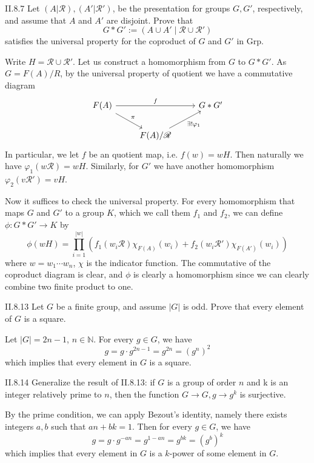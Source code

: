 \begin{problem}{II.8.7}
Let $(A|\mathscr{R}), (A'|\mathscr{R'})$, be the presentation for groups $G, G'$, respectively, and assume that $A$ and $A'$ are disjoint. Prove that
\[
G * G' := (A \cup A' \; |\; \mathscr{R} \cup \mathscr{R'})
\]
satisfies the universal property for the coproduct of $G$ and $G'$ in \textsf{Grp}.
\end{problem}
\begin{pf} Write $H = \mathscr{R} \cup \mathscr{R'}$. Let us construct a homomorphism from $G$ to $G * G'$. As $G = F(A)/R$, by the universal property of quotient we have a commutative diagram
\[
\begin{tikzcd}
F(A) \arrow[rr, "f"] \arrow[rd, "\pi"] &                                                   & G * G' \\
& F(A)/\mathscr{R} \arrow[ru, "\exists!\varphi_1"'] &       
\end{tikzcd}
\]
In particular, we let $f$ be an quotient map, i.e. $f(w) = wH$. Then naturally we have $\varphi_1(w\mathscr{R}) = wH$. Similarly, for $G'$ we have another homomorphism $\varphi_2(v\mathscr{R}') = vH$.

Now it suffices to check the universal property. For every homomorphism that maps $G$ and $G'$ to a group $K$, which we call them $f_1$ and $f_2$, we can define $\phi : G * G' \to K$ by
\[ 
\phi(wH) = \prod_{i = 1}^{|w|} \left( f_1(w_i\mathscr{R}) \chi_{F(A)}(w_i) +  f_2(w_i\mathscr{R}') \chi_{F(A')}(w_i) \right)
\]
where $w = w_1 \cdots w_n$, $\chi$ is the indicator function. The commutative of the coproduct diagram is clear, and $\phi$ is clearly a homomorphism since we can clearly combine two finite product to one.
\end{pf}

\begin{problem}{II.8.13}
Let $G$ be a finite group, and assume $|G|$ is odd. Prove that every element of $G$ is a square.
\end{problem}
\begin{pf}
Let $|G|=2n-1$, $n \in \mathbb{N}$. For every $g \in G$, we have
\[
g = g \cdot g^{2n-1} = g^{2n} = (g^n)^2    
\]
which implies that every element in $G$ is a square.
\end{pf}

\begin{problem}{II.8.14}
Generalize the result of II.8.13: if $G$ is a group of order $n$ and k is an integer relatively prime to $n$, then the function $G \to G, g \to g^k$ is surjective.
\end{problem}
\begin{pf}
By the prime condition, we can apply Bezout's identity, namely there exists integers $a,b$ such that $an + bk = 1$. Then for every $g \in G$, we have
\[
g = g \cdot g^{-an} = g^{1-an} = g^{bk} = (g^b)^k    
\]
which implies that every element in $G$ is a $k$-power of some element in $G$.
\end{pf}    

